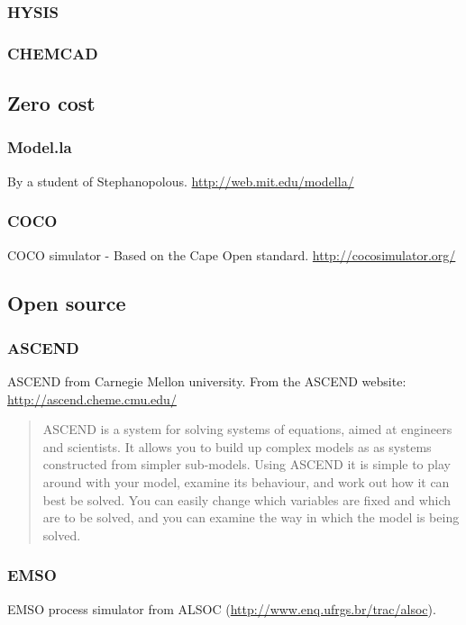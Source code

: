 \subsubsection{HYSIS}

\subsubsection{CHEMCAD}

\subsection{Zero cost}
\subsubsection{Model.la}
By a student of Stephanopolous. \url{http://web.mit.edu/modella/}

\subsubsection{COCO}
COCO simulator - Based on the Cape Open standard.  \url{http://cocosimulator.org/}

\subsection{Open source}

\subsubsection{ASCEND}
ASCEND from Carnegie Mellon university.  From the ASCEND website: \url{http://ascend.cheme.cmu.edu/}
\begin{quote}
  ASCEND is a system for solving systems of equations, aimed at engineers and scientists. It allows you to build up complex models as as systems constructed from simpler sub-models. Using ASCEND it is simple to play around with your model, examine its behaviour, and work out how it can best be solved. You can easily change which variables are fixed and which are to be solved, and you can examine the way in which the model is being solved.
\end{quote}
\subsubsection{EMSO}
EMSO process simulator from ALSOC (\url{http://www.enq.ufrgs.br/trac/alsoc}).


